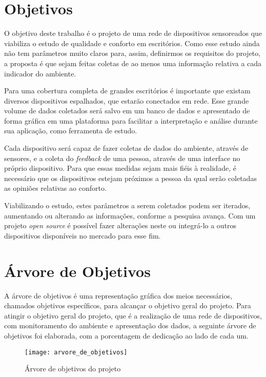 \documentclass[../monografia.tex]{subfiles}
\begin{document}
\section{Objetivos}

O objetivo deste trabalho é o projeto de uma rede de dispositivos sensoreados que viabiliza o estudo de qualidade e conforto em escritórios. Como esse estudo ainda não tem parâmetros muito claros para, assim, definirmos os requisitos do projeto, a proposta é que sejam feitas coletas de ao menos uma informação relativa a cada indicador do ambiente. 

Para uma cobertura completa de grandes escritórios é importante que existam diversos dispositivos espalhados, que estarão conectados em rede. Esse grande volume de dados coletados será salvo em um banco de dados e apresentado de forma gráfica em uma plataforma para facilitar a interpretação e análise durante sua aplicação, como ferramenta de estudo. 

Cada dispositivo será capaz de fazer coletas de dados do ambiente, através de sensores, e a coleta do \textit{feedback} de uma pessoa, através de uma interface no próprio dispositivo. Para que essas medidas sejam mais fiéis à realidade, é necessário que os dispositivos estejam próximos a pessoa da qual serão coletadas as opiniões relativas ao conforto. 

Viabilizando o estudo, estes parâmetros a serem coletados podem ser iterados, aumentando ou alterando as informações, conforme a pesquisa avança. Com um projeto \textit{open source} é possível fazer alterações neste ou integrá-lo a outros dispositivos disponíveis no mercado para esse fim. 

\section{Árvore de Objetivos} 
A árvore de objetivos é uma representação gráfica dos meios necessários, chamados objetivos específicos, para alcançar o objetivo geral do projeto. 
Para atingir o objetivo geral do projeto, que é a realização de uma rede de dispositivos, com monitoramento do ambiente e apresentação dos dados, a seguinte árvore de objetivos foi elaborada, com a porcentagem de dedicação ao lado de cada um.

\begin{figure}[h!]
\texttt{[image: arvore\_de\_objetivos]}
\centering
\caption{Árvore de objetivos do projeto}
\label{fig:objective-tree}
\end{figure}
\end{document}
